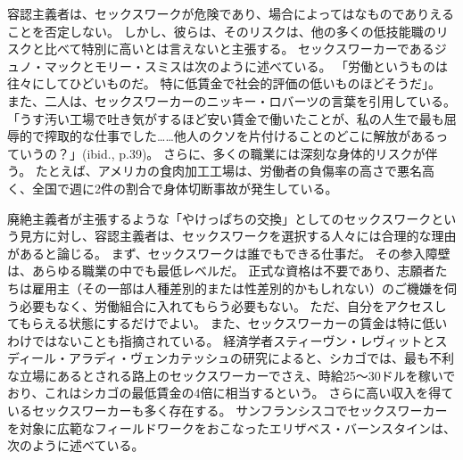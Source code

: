\documentclass[paper=a4,book,openany]{jlreq}
\newcommand{\ig}[1]{}           %
\begin{document}
容認主義者は、セックスワークが危険であり、場合によってはなものでありえることを否定しない。
しかし、彼らは、そのリスクは、他の多くの低技能職のリスクと比べて特別に高いとは言えないと主張する。
セックスワーカーであるジュノ・マックとモリー・スミスは次のように述べている。
「労働というものは往々にしてひどいものだ。
特に低賃金で社会的評価の低いものほどそうだ」\citep[p.43]{mac18:_revol_prost}。
また、二人は、セックスワーカーのニッキー・ロバーツ\ig{Nickie Roberts}の言葉を引用している。
「うす汚い工場で吐き気がするほど安い賃金で働いたことが、私の人生で最も屈辱的で搾取的な仕事でした……他人のクソを片付けることのどこに解放があるっていうの？」(ibid., p.39)。
さらに、多くの職業には深刻な身体的リスクが伴う。
たとえば、アメリカの食肉加工工場は、労働者の負傷率の高さで悪名高く、全国で週に2件の割合で身体切断事故が発生している\citep{wasley18:_two_amput_week}。

廃絶主義者が主張するような「やけっぱちの交換」としてのセックスワークという見方に対し、容認主義者は、セックスワークを選択する人々には合理的な理由があると論じる。
まず、セックスワークは誰でもできる仕事だ。
その参入障壁は、あらゆる職業の中でも最低レベルだ。
正式な資格は不要であり、志願者たちは雇用主（その一部は人種差別的または性差別的かもしれない）のご機嫌を伺う必要もなく、労働組合に入れてもらう必要もない。
ただ、自分をアクセスしてもらえる状態にするだけでよい。
また、セックスワーカーの賃金は特に低いわけではないことも指摘されている。
経済学者スティーヴン・レヴィットとスディール・アラディ・ヴェンカテッシュの研究によると、シカゴでは、最も不利な立場にあるとされる路上のセックスワーカーでさえ、時給25～30ドルを稼いでおり、これはシカゴの最低賃金の4倍に相当するという\citep[p.26]{levitt07:_empir_analy_street_level_prost}。
さらに高い収入を得ているセックスワーカーも多く存在する。
サンフランシスコでセックスワーカーを対象に広範なフィールドワークをおこなったエリザベス・バーンスタインは、次のように述べている。
\end{document}
